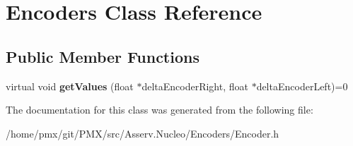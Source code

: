 \hypertarget{classEncoders}{}\section{Encoders Class Reference}
\label{classEncoders}
\subsection*{Public Member Functions}
\begin{DoxyCompactItemize}
\item 
\mbox{\label{classEncoders_a2779db112e2d83d636d9432c314a4608}} 
virtual void {\bfseries get\+Values} (float $\ast$delta\+Encoder\+Right, float $\ast$delta\+Encoder\+Left)=0
\end{DoxyCompactItemize}


The documentation for this class was generated from the following file\+:\begin{DoxyCompactItemize}
\item 
/home/pmx/git/\+P\+M\+X/src/\+Asserv.\+Nucleo/\+Encoders/Encoder.\+h\end{DoxyCompactItemize}
